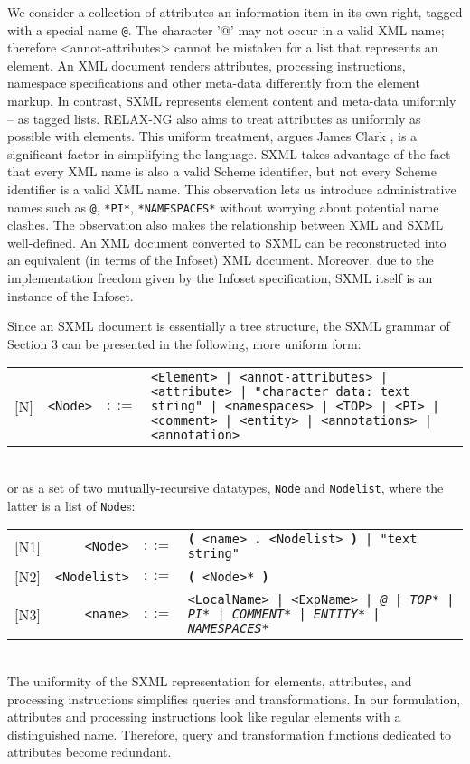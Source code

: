 \documentclass[10pt]{article}
\begin{document}
We consider a collection of attributes an information item in its
own right, tagged with a special name \texttt{@}. The character '@'
may not occur in a valid XML name; therefore <annot-attributes> cannot be mistaken for a list that represents an element. An XML
document renders attributes, processing instructions, namespace
specifications and other meta-data differently from the element
markup. In contrast, SXML represents element content and meta-data
uniformly -- as tagged lists. RELAX-NG also aims to treat attributes
as uniformly as possible with elements. This uniform treatment, argues James
Clark \cite{RNG-Design}, is a significant factor
in simplifying the language.  SXML takes advantage of the fact that
every XML name is also a valid Scheme identifier, but not every
Scheme identifier is a valid XML name. This observation lets us
introduce administrative names such as \texttt{@}, \texttt{*PI*}, \texttt{*NAMESPACES*} without worrying about potential name
clashes. The observation also makes the relationship between XML and SXML
well-defined. An XML document converted to SXML can be reconstructed
into an equivalent (in terms of the Infoset) XML document. Moreover, due
to the implementation freedom given by the Infoset specification, SXML
itself is an instance of the Infoset.

Since an SXML document is essentially a tree structure, the SXML grammar of Section 3 can be presented in the following, more uniform form:

\begin{tabular}{rrcp{2.8in}}
{[}N{]} & \texttt{<Node>} &  $::=$ & \texttt{<Element> | <annot-attributes> | <attribute> | "character data: text string" | <namespaces> | <TOP> | <PI> | <comment> | <entity> | <annotations> | <annotation> } \\
\end{tabular}
\\
or as a set of two mutually-recursive datatypes, 
\texttt{Node} and \texttt{Nodelist}, where the latter is a
list of \texttt{Node}s: 

\begin{tabular}{rrcp{2.8in}}
{[}N1{]} & \texttt{<Node>} &  $::=$ & \texttt{\textbf{(} <name>\textbf{ . }<Nodelist> \textbf{)} | "text string" } \\
{[}N2{]} & \texttt{<Nodelist>} &  $::=$ & \texttt{\textbf{(} <Node>* \textbf{)} } \\
{[}N3{]} & \texttt{<name>} &  $::=$ & \texttt{<LocalName> | <ExpName> | {\itshape @} | {\itshape *TOP*} | {\itshape *PI*} | {\itshape *COMMENT*} | {\itshape *ENTITY*} | {\itshape *NAMESPACES*} } \\
\end{tabular}
\\
The uniformity of the SXML representation for elements,
attributes, and processing instructions simplifies queries and
transformations. In our formulation, attributes and processing
instructions look like regular elements with a distinguished
name. Therefore, query and transformation functions dedicated to
attributes become redundant.
\end{document}
